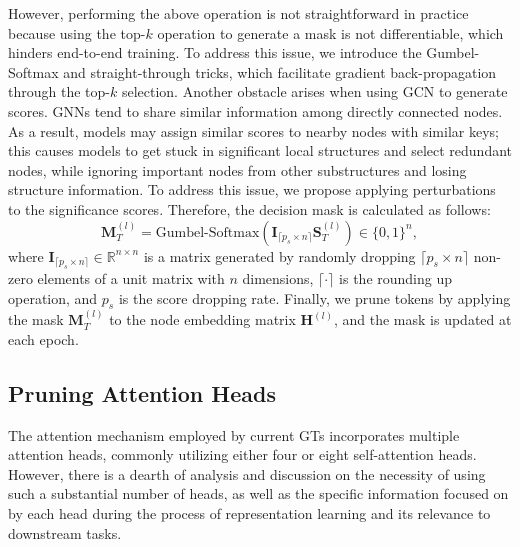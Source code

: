 \documentclass[letterpaper]{article} %
\begin{document}
However, performing the above operation is not straightforward in practice because using the top-$k$ operation to generate a mask is not differentiable, which hinders end-to-end training. To address this issue, we introduce the Gumbel-Softmax and straight-through tricks, which facilitate gradient back-propagation through the top-$k$ selection. Another obstacle arises when using GCN to generate scores. GNNs tend to share similar information among directly connected nodes. As a result, models may assign similar scores to nearby nodes with similar keys; this causes models to get stuck in significant local structures and select redundant nodes, while ignoring important nodes from other substructures and losing structure information. To address this issue, we propose applying perturbations to the significance scores. Therefore, the decision mask is calculated as follows:
\begin{equation}
\mathbf{M}_{T}^{(l)}  = \text{Gumbel-Softmax}(\mathbf{I}_{\lceil {p_s}\times {n}\rceil} \mathbf{S}_{T}^{(l)}) \in \{0, 1\}^{n},
\end{equation}
where $ \mathbf{I}_{\lceil {p_s}\times {n}\rceil} \in \displaystyle \mathbb{R}^{ n \times n}$ is a matrix generated by randomly dropping $\lceil {p_s}\times {n} \rceil$ non-zero elements of a unit matrix with $n$ dimensions, $\lceil \cdot \rceil$ is the rounding up operation,  and  $p_s$ is the score dropping rate. Finally, we prune tokens by applying the mask $\mathbf{M}_{T}^{(l)}$ to the node embedding matrix $\mathbf{H}^{(l)}$, and the mask is updated at each epoch.







\subsection{Pruning Attention Heads}
\label{sec:pruning-head}

The attention mechanism employed by current GTs incorporates multiple attention heads, commonly utilizing either four or eight self-attention heads. However, there is a dearth of analysis and discussion on the necessity of using such a substantial number of heads, as well as the specific information focused on by each head during the process of representation learning and its relevance to downstream tasks.
\end{document}
